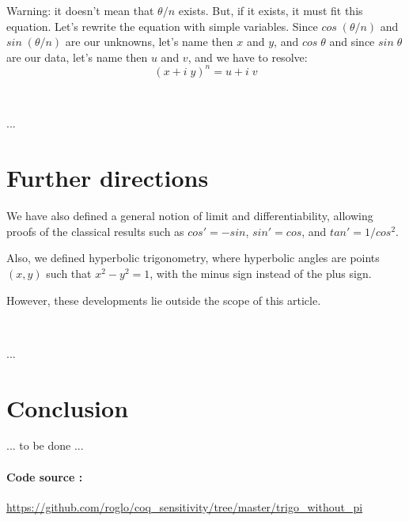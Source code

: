 \documentclass[11pt]{article}
\theoremstyle{definition}
\begin{document}
Warning: it doesn't mean that $\theta / n$ exists. But, if it exists,
it must fit this equation. Let's rewrite the equation with simple
variables. Since $cos\;(\theta/n)$ and $sin\;(\theta/n)$ are our
unknowns, let's name then $x$ and $y$, and $cos\;\theta$ and since
$sin\;\theta$ are our data, let's name then $u$ and $v$, and we have
to resolve:
\[
(x + i \; y)^n = u + i \; v
\]

\

...

\section*{Further directions}

We have also defined a general notion of limit and differentiability,
allowing proofs of the classical results such as $cos'=-sin$,
$sin'=cos$, and $tan'=1/cos^2$.

Also, we defined hyperbolic trigonometry, where hyperbolic angles are
points $(x, y)$ such that $x^2-y^2=1$, with the minus sign instead of
the plus sign.

However, these developments lie outside the scope of this article.

\

...

\section*{Conclusion}

... to be done ...

\paragraph{Code source :}
\url{https://github.com/roglo/coq_sensitivity/tree/master/trigo_without_pi}
\end{document}
